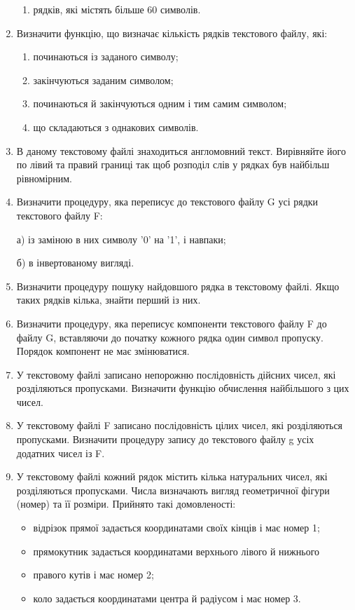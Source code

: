 \documentclass[]{article}
\makeatletter
\newcommand{\xslalph}[1]{\expandafter\@xslalph\csname c@#1\endcsname}
\newcommand{\@xslalph}[1]{%
    \ifcase#1\or а\or б\or в\or г\or д\or e\or є\or ж\or з\or i%
    \or й\or к\or л\or м\or н\or о\or п\or р\or с\or т%
    \or у\or ф\or х\or ц\or ч\or ш\or ю\or я\or аа\or бб\or вв %
    \else\@ctrerr\fi%
}
\makeatother
\begin{document}
\begin{enumerate}
\begin{enumerate}[label=\xslalph*)]
\item рядків, які містять більше 60 символів.
\end{enumerate}

\item
 Визначити функцію, що визначає кількість рядків текстового файлу,
які:
\begin{enumerate}[label=\xslalph*)]
\item починаються із заданого символу;

\item закінчуються заданим символом;

\item починаються й закінчуються одним і тим самим символом;

\item що складаються з однакових символів.
\end{enumerate}

\item
В даному текстовому файлі знаходиться англомовний текст. Вирівняйте його
по лівий та правий границі так щоб розподіл слів у рядках був найбільш
рівномірним.
\item
Визначити процедуру, яка переписує до текстового файлу G усі рядки
текстового файлу F:

а) із заміною в них символу '0' на '1', і навпаки;

б) в інвертованому вигляді.
\item
Визначити процедуру пошуку найдовшого рядка в текстовому файлі. Якщо
таких рядків кілька, знайти перший із них.
\item
Визначити процедуру, яка переписує компоненти текстового файлу F до
файлу G, вставляючи до початку кожного рядка один символ пропуску.
Порядок компонент не має змінюватися.
\item
У текстовому файлі записано непорожню послідовність дійсних чисел, які
розділяються пропусками. Визначити функцію обчислення найбільшого з цих
чисел.
\item
У текстовому файлі F записано послідовність цілих чисел, які
розділяються пропусками. Визначити процедуру запису до текстового файлу
g усіх додатних чисел із F.
\item
У текстовому файлі кожний рядок містить кілька натуральних чисел, які
розділяються пропусками. Числа визначають вигляд геометричної фігури
(номер) та її розміри. Прийнято такі домовленості:
\begin{itemize}
\item
відрізок прямої задається координатами своїх кінців і має номер 1;
\item
прямокутник задається координатами верхнього лівого й нижнього
\item
правого кутів і має номер 2;
\item
коло задається координатами центра й радіусом і має номер 3.
\end{itemize}


\end{enumerate}
\end{document}
